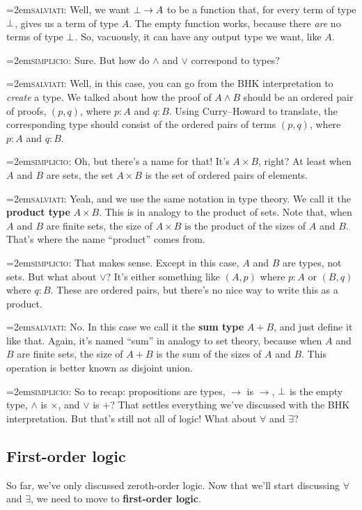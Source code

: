 \documentclass[11pt,paper=letter]{scrartcl}
\renewcommand{\land}{\wedge}
\renewcommand{\lor}{\vee}
\newcommand{\simp}{\vspace{0.5em}\noindent\hangindent=2em\textsc{simplicio:} }
\newcommand{\salv}{\vspace{0.5em}\noindent\hangindent=2em\textsc{salviati:} }
\begin{document}
\salv Well, we want $\bot \to A$ to be a function that, for every term of type $\bot$, gives us a term of type $A$. The empty function works, because there \emph{are} no terms of type $\bot$. So, vacuously, it can have any output type we want, like $A$.

\simp Sure. But how do $\land$ and $\lor$ correspond to types?

\salv Well, in this case, you can go from the BHK interpretation to \emph{create} a type. We talked about how the proof of $A \land B$ should be an ordered pair of proofs, $(p, q)$, where $p : A$ and $q : B$. Using Curry--Howard to translate, the corresponding type should consist of the ordered pairs of terms $(p, q)$, where $p : A$ and $q : B$.

\simp Oh, but there's a name for that! It's $A \times B$, right? At least when $A$ and $B$ are sets, the set $A \times B$ is the set of ordered pairs of elements.

\salv Yeah, and we use the same notation in type theory. We call it the \textbf{product type} $A \times B$. This is in analogy to the product of sets. Note that, when $A$ and $B$ are finite sets, the size of $A \times B$ is the product of the sizes of $A$ and $B$. That's where the name ``product'' comes from.

\simp That makes sense. Except in this case, $A$ and $B$ are types, not sets. But what about $\lor$? It's either something like $(A, p)$ where $p : A$ or $(B, q)$ where $q : B$. These are ordered pairs, but there's no nice way to write this as a product.

\salv No. In this case we call it the \textbf{sum type} $A + B$, and just define it like that. Again, it's named ``sum'' in analogy to set theory, because when $A$ and $B$ are finite sets, the size of $A + B$ is the sum of the sizes of $A$ and $B$. This operation is better known as disjoint union.

\simp So to recap: propositions are types, $\to$ is $\to$, $\bot$ is the empty type, $\land$ is $\times$, and $\lor$ is $+$? That settles everything we've discussed with the BHK interpretation. But that's still not all of logic! What about $\forall$ and $\exists$?

\subsection{First-order logic}

So far, we've only discussed zeroth-order logic. Now that we'll start discussing $\forall$ and $\exists$, we need to move to \textbf{first-order logic}.
\end{document}
